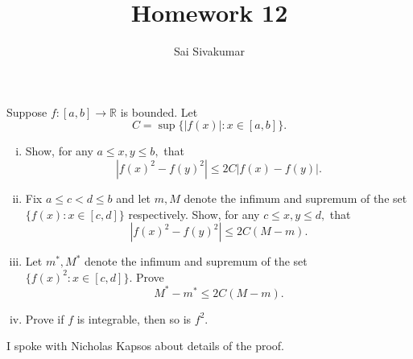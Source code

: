 \documentclass[12pt]{amsart}
\title{Homework 12}
\author{Sai Sivakumar}
\newcommand{\RR}{\mathbb{R}}
\begin{document}
\maketitle

Suppose $f:[a,b]\to\RR$ is bounded. Let
\[
 C= \sup\{|f(x)|: x\in [a,b]\}.
\]

\begin{enumerate}[(i)]\itemsep=10pt
 \item Show, for any $a\le x,y\le b,$ that
\[
 |f(x)^2-f(y)^2| \le 2C |f(x)-f(y)|.
\]
\item Fix $a\le c<d \le b$ and let 
 $m,M$ denote the infimum and supremum 
 of the set $\{f(x): x\in [c,d]\}$ respectively.
 Show, for any $c\le x,y\le d,$ that
\[
  |f(x)^2-f(y)^2| \le 2C(M-m).
\]
 \item Let $m^*,M^*$ denote the infimum and supremum
 of the set $\{f(x)^2: x\in [c,d]\}.$ Prove
\[
 M^*-m^* \le 2C (M-m).
\]
 \item Prove if $f$ is integrable, then so is $f^2.$
\end{enumerate}
\bigskip
I spoke with Nicholas Kapsos about details of the proof.
\end{document}
